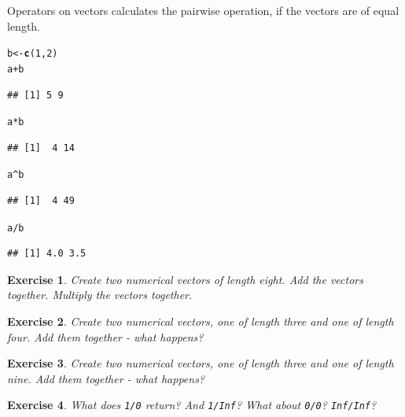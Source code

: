 \documentclass{article}\usepackage[]{graphicx}\usepackage[]{color}
\makeatletter
\newcommand{\hlnum}[1]{\textcolor[rgb]{0.686,0.059,0.569}{#1}}%
\newcommand{\hlopt}[1]{\textcolor[rgb]{0,0,0}{#1}}%
\newcommand{\hlstd}[1]{\textcolor[rgb]{0.345,0.345,0.345}{#1}}%
\newcommand{\hlkwb}[1]{\textcolor[rgb]{0.69,0.353,0.396}{#1}}%
\newcommand{\hlkwd}[1]{\textcolor[rgb]{0.737,0.353,0.396}{\textbf{#1}}}%
\newenvironment{kframe}{%
 \def\at@end@of@kframe{}%
 \ifinner\ifhmode%
  \def\at@end@of@kframe{\end{minipage}}%
  \begin{minipage}{\columnwidth}%
 \fi\fi%
 \def\FrameCommand##1{\hskip\@totalleftmargin \hskip-\fboxsep
 \colorbox{shadecolor}{##1}\hskip-\fboxsep
     \hskip-\linewidth \hskip-\@totalleftmargin \hskip\columnwidth}%
 \MakeFramed {\advance\hsize-\width
   \@totalleftmargin\z@ \linewidth\hsize
   \@setminipage}}%
 {\par\unskip\endMakeFramed%
 \at@end@of@kframe}
\newenvironment{knitrout}{}{} %
\newtheorem{exercise}{Exercise}[section]
\makeatother
\begin{document}
Operators on vectors calculates the pairwise operation, if the vectors are of equal length.
\begin{knitrout}
\color{fgcolor}\begin{kframe}
\begin{alltt}
\hlstd{b} \hlkwb{<-} \hlkwd{c}\hlstd{(}\hlnum{1}\hlstd{,} \hlnum{2}\hlstd{)}
\hlstd{a} \hlopt{+} \hlstd{b}
\end{alltt}
\begin{verbatim}
## [1] 5 9
\end{verbatim}
\begin{alltt}
\hlstd{a} \hlopt{*} \hlstd{b}
\end{alltt}
\begin{verbatim}
## [1]  4 14
\end{verbatim}
\begin{alltt}
\hlstd{a} \hlopt{^} \hlstd{b}
\end{alltt}
\begin{verbatim}
## [1]  4 49
\end{verbatim}
\begin{alltt}
\hlstd{a} \hlopt{/} \hlstd{b}
\end{alltt}
\begin{verbatim}
## [1] 4.0 3.5
\end{verbatim}
\end{kframe}
\end{knitrout}

\begin{exercise}
Create two numerical vectors of length eight. Add the vectors together. Multiply the vectors together.
\end{exercise}

\begin{exercise}
Create two numerical vectors, one of length three and one of length four. Add them together - what happens?
\end{exercise}

\begin{exercise}
Create two numerical vectors, one of length three and one of length nine. Add them together - what happens?
\end{exercise}

\begin{exercise}
What does \texttt{1/0} return? And \texttt{1/Inf}? What about \texttt{0/0}? \texttt{Inf/Inf}?
\end{exercise}
\end{document}
